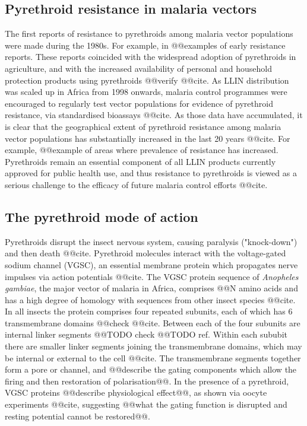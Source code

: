 \documentclass[a4paper,11pt,abstracton,hidelinks]{scrartcl}
\begin{document}
\subsection*{Pyrethroid resistance in malaria vectors}


%
The first reports of resistance to pyrethroids among malaria vector populations were made during the 1980s.
%
For example, in @@examples of early resistance reports.
%
These reports coincided with the widespread adoption of pyrethroids in agriculture, and with the increased availability of personal and household protection products using pyrethroids @@verify @@cite.
%
As LLIN distribution was scaled up in Africa from 1998 onwards, malaria control programmes were encouraged to regularly test vector populations for evidence of pyrethroid resistance, via standardised bioassays @@cite.
%
As those data have accumulated, it is clear that the geographical extent of pyrethroid resistance among malaria vector populations has substantially increased in the last 20 years @@cite.
%
For example, @@example of areas where prevalence of resistance has increased.
%
Pyrethroids remain an essential component of all LLIN products currently approved for public health use, and thus resistance to pyrethroids is viewed as a serious challenge to the efficacy of future malaria control efforts @@cite.


\subsection*{The pyrethroid mode of action}


%
Pyrethroids disrupt the insect nervous system, causing paralysis ("knock-down") and then death @@cite.
%
Pyrethroid molecules interact with the voltage-gated sodium channel (VGSC), an essential membrane protein which propagates nerve impulses via action potentials @@cite.
%
The VGSC protein sequence of \textit{Anopheles gambiae}, the major vector of malaria in Africa, comprises @@N amino acids and has a high degree of homology with sequences from other insect species @@cite.
%
In all insects the protein comprises four repeated subunits, each of which has 6 transmembrane domains @@check @@cite.
%
Between each of the four subunits are internal linker segments @@TODO check @@TODO ref.
%
Within each sububit there are smaller linker segments joining the transmembrane domains, which may be internal or external to the cell @@cite.
%
The transmembrane segments together form a pore or channel, and @@describe the gating components which allow the firing and then restoration of polarisation@@.
%
In the presence of a pyrethroid, VGSC proteins @@describe physiological effect@@, as shown via oocyte experiments @@cite, suggesting @@what the gating function is disrupted and resting potential cannot be restored@@.
\end{document}
